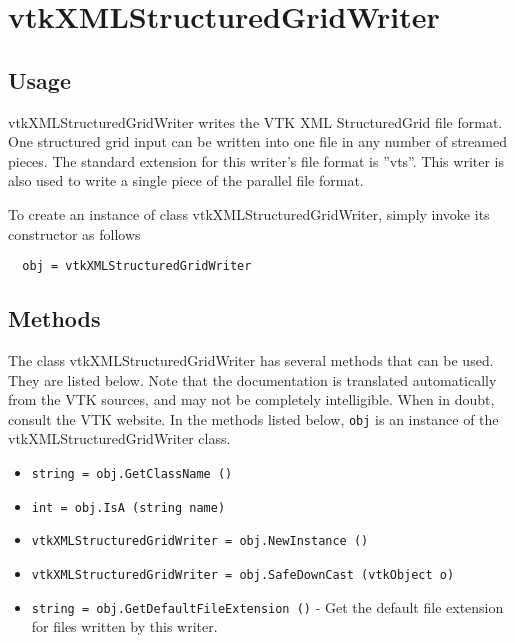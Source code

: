 \section{vtkXMLStructuredGridWriter}

\subsection{Usage}

 vtkXMLStructuredGridWriter writes the VTK XML StructuredGrid file
 format.  One structured grid input can be written into one file in
 any number of streamed pieces.  The standard extension for this
 writer's file format is ''vts''.  This writer is also used to write a
 single piece of the parallel file format.

To create an instance of class vtkXMLStructuredGridWriter, simply
invoke its constructor as follows
\begin{verbatim}
  obj = vtkXMLStructuredGridWriter
\end{verbatim}
\subsection{Methods}

The class vtkXMLStructuredGridWriter has several methods that can be used.
  They are listed below.
Note that the documentation is translated automatically from the VTK sources,
and may not be completely intelligible.  When in doubt, consult the VTK website.
In the methods listed below, \verb|obj| is an instance of the vtkXMLStructuredGridWriter class.
\begin{itemize}
\item  \verb|string = obj.GetClassName ()|

\item  \verb|int = obj.IsA (string name)|

\item  \verb|vtkXMLStructuredGridWriter = obj.NewInstance ()|

\item  \verb|vtkXMLStructuredGridWriter = obj.SafeDownCast (vtkObject o)|

\item  \verb|string = obj.GetDefaultFileExtension ()| -  Get the default file extension for files written by this writer.

\end{itemize}
